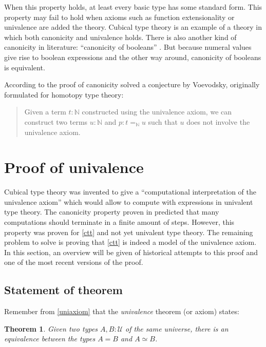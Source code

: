 \documentclass[12pt,a4paper,twoside,xetex,draft]{book}
\newcommand{\keyword}[1]{\emph{#1}\index{#1}}
\newtheorem{theorem}{Theorem}[section]
\begin{document}
When this property holds, at least every basic type has some standard form.  This property may fail to hold when axioms such as function extensionality or univalence are added the theory. Cubical type theory is an example of a theory in which both canonicity and univalence holds. There is also another kind of canonicity in literature: ``canonicity of booleans'' \cite{Angiuli2018}. But because numeral values give rise to boolean expressions and the other way around, canonicity of booleans is equivalent.

According to \cite{Brunerie2018} the proof of canonicity solved a conjecture by Voevodsky, originally formulated for homotopy type theory:


\begin{quotation}
Given a term $t: \mathbb{N}$ constructed using the univalence axiom, we can construct two terms $u : \mathbb{N}$ and $p : t =_{\mathbb{N}} u$ such that $u$ does not involve the univalence axiom.
\end{quotation}

\section{Proof of univalence}\label{univalenceproof}

Cubical type theory was invented to give a ``computational interpretation of the univalence axiom'' which would allow to compute with expressions in univalent type theory. The canonicity property proven in \cite{Brunerie2018} predicted that many computations should terminate in a finite amount of steps. However, this property was proven for \cref{ctt} and not yet univalent type theory. The remaining problem to solve is proving that \cref{ctt} is indeed a model of the univalence axiom. In this section, an overview will be given of historical attempts to this proof and one of the most recent versions of the proof.


\subsection{Statement of theorem}

Remember from \cref{uniaxiom} that the \keyword{univalence} theorem (or axiom) states:

\begin{theorem}
 Given two types $A, B : \mathcal{U}$ of the same universe, there is an equivalence between the types $A = B$ and $A \simeq B$.
 \end{theorem}
\end{document}
